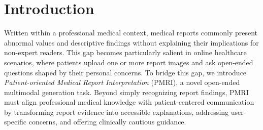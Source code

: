 \documentclass[letterpaper]{article} %
\begin{document}
\section{Introduction}
Written within a professional medical context, medical reports commonly present abnormal values and descriptive findings without explaining their implications for non-expert readers. 
This gap becomes particularly salient in online healthcare scenarios, where patients upload one or more report images and ask open-ended questions shaped by their personal concerns. 
To bridge this gap, we introduce \emph{Patient-oriented Medical Report Interpretation} (PMRI), a novel open-ended multimodal generation task.
Beyond simply recognizing report findings, PMRI must align professional medical knowledge with patient-centered communication by transforming report evidence into accessible explanations, addressing user-specific concerns, and offering clinically cautious guidance.
\end{document}
